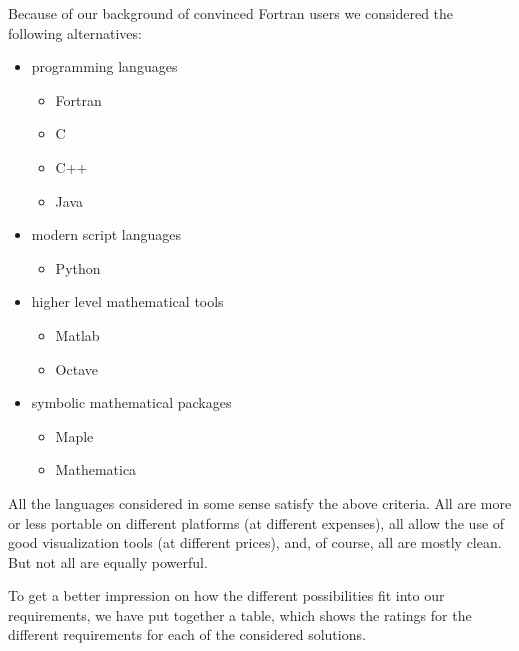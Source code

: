 Because of our background of convinced Fortran users we considered the 
following alternatives: 
\begin{itemize}
\item programming languages 
 \begin{itemize}
  \item Fortran
  \item C
  \item C++
  \item Java
 \end{itemize}
\item modern script languages
 \begin{itemize}
   \item Python
 \end{itemize}
\item higher level mathematical tools
 \begin{itemize}
   \item Matlab
   \item Octave
 \end{itemize}
\item symbolic mathematical packages
 \begin{itemize}
   \item Maple
   \item Mathematica
 \end{itemize}
\end{itemize}

All the languages considered  in some sense satisfy the above criteria. All
are more  or less portable on different platforms (at different expenses), all
allow the use of good visualization tools (at different prices), and, of 
course, all are mostly clean. But not all are equally powerful. 

To get a better impression on how the different possibilities fit into 
our requirements, we have put together a table, which shows the
ratings for the different requirements for each of the considered 
solutions.

